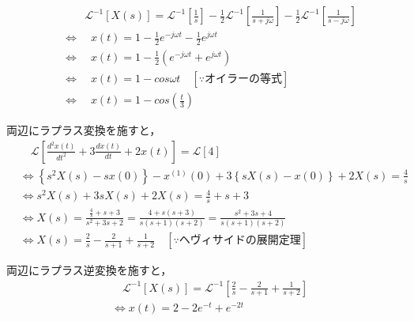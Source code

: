 \documentclass[a4paper,12pt]{article}
\begin{document}
\begin{tcolorbox}[title={[12] つぎの微分方程式をラプラス変換を用いて解け.
  \[
      9 \frac{d^2 x(t)}{dt^2} + x(t) = 1 
  \]
  \quad ただし，初期値は，$x(0) = 0,\ x'(0) = 0$ とする．
  }]
\begin{align*}
    &\qquad  \mathcal{L}^{-1} \left[ X(s) \right]
    = \mathcal{L}^{-1} \left[ \frac{1}{s} \right] 
    - \frac{1}{2} \mathcal{L}^{-1} \left[\frac{1}{s + j \omega} \right]
    - \frac{1}{2} \mathcal{L}^{-1} \left[\frac{1}{s - j \omega} \right] \\
    &\Leftrightarrow \quad x(t) 
    = 1 - \frac{1}{2} e^{-j \omega t} - \frac{1}{2} e^{j \omega t} \\
    &\Leftrightarrow \quad x(t) 
    = 1 - \frac{1}{2} \left( e^{-j \omega t} + e^{j \omega t} \right) \\
    &\Leftrightarrow \quad x(t) 
    = 1 - cos{\omega t} \quad \left[ \because オイラーの等式 \right]\\
    &\Leftrightarrow \quad x(t) 
    = 1 - cos \left(\frac{t}{3}\right)
\end{align*}



\vspace{2mm}
  \end{tcolorbox}
\begin{tcolorbox}[title={[13] つぎの微分方程式をラプラス変換を用いて解け．
  \[
  \frac{d^2 x(t)}{dt^2} + 3 \frac{dx(t)}{dt} + 2x(t) = 4
  \]
  \quad ただし，初期条件は，$x(0)=1,\ x^{(1)}(0)=0$ とする． }]

  \quad 両辺にラプラス変換を施すと，
\vspace{-3mm}
\begin{align*}
&\quad \mathcal{L} \left[ \frac{d^2 x(t)}{dt^2} + 3 \frac{dx(t)}{dt} + 2x(t) \right]
= \mathcal{L} \left[ 4 \right] \\
&\Leftrightarrow \left\{s^2 X(s) - sx(0)\right\} - x^{(1)}(0) + 3\left\{sX(s) - x(0) \right\} + 2X(s) = \frac{4}{s} \\
&\Leftrightarrow s^2 X(s) + 3sX(s) + 2X(s) = \frac{4}{s} + s + 3 \\
&\Leftrightarrow X(s) = \frac{\frac{4}{s} + s + 3}{s^2 + 3s + 2} = \frac{4 + s(s + 3)}{s(s + 1)(s + 2)} = \frac{s^2 + 3s + 4}{s(s + 1)(s + 2)} \\
&\Leftrightarrow X(s) = \frac{2}{s} - \frac{2}{s+1} + \frac{1}{s+2} \quad \left[ \because ヘヴィサイドの展開定理 \right]
\end{align*}

\quad 両辺にラプラス逆変換を施すと，
\vspace{-3mm}
\begin{align*}
&\quad \mathcal{L}^{-1} \left[ X(s) \right] 
= \mathcal{L}^{-1} \left[ \frac{2}{s} - \frac{2}{s+1} + \frac{1}{s+2} \right] \\
&\Leftrightarrow x(t) = 2 - 2e^{-t} + e^{-2t}
\end{align*}



\vspace{2mm}
  \end{tcolorbox}
\end{document}
